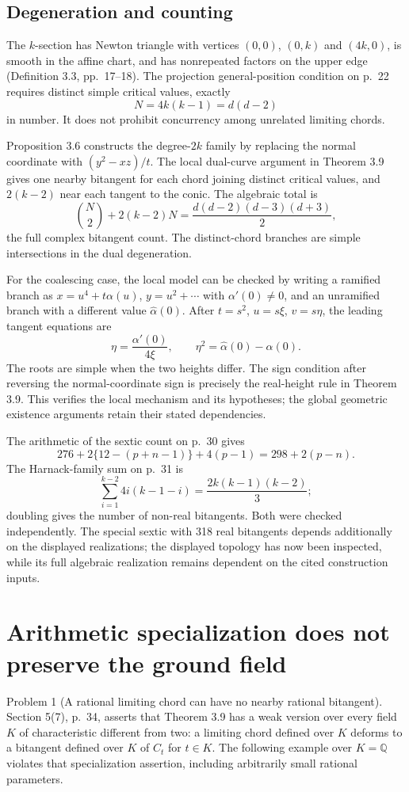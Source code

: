 \documentclass[10pt]{article}
\begin{document}
\subsection*{Degeneration and counting}
The \(k\)-section has Newton triangle with vertices \((0,0)\), \((0,k)\) and \((4k,0)\), is smooth in the affine chart, and has nonrepeated factors on the upper edge (Definition 3.3, pp. 17–18). The projection general-position condition on p. 22 requires distinct simple critical values, exactly \[N=4k(k-1)=d(d-2)\] in number. It does not prohibit concurrency among unrelated limiting chords.\par
Proposition 3.6 constructs the degree-\(2k\) family by replacing the normal coordinate with \((y^2-xz)/t\). The local dual-curve argument in Theorem 3.9 gives one nearby bitangent for each chord joining distinct critical values, and \(2(k-2)\) near each tangent to the conic. The algebraic total is \[\binom{N}{2}+2(k-2)N
 =\frac{d(d-2)(d-3)(d+3)}2,\] the full complex bitangent count. The distinct-chord branches are simple intersections in the dual degeneration.\par
For the coalescing case, the local model can be checked by writing a ramified branch as \(x=u^4+t\alpha(u)\), \(y=u^2+\cdots\) with \(\alpha'(0)\ne0\), and an unramified branch with a different value \(\widehat\alpha(0)\). After \(t=s^2\), \(u=s\xi\), \(v=s\eta\), the leading tangent equations are \[\eta=\frac{\alpha'(0)}{4\xi},\qquad
 \eta^2=\widehat\alpha(0)-\alpha(0).\] The roots are simple when the two heights differ. The sign condition after reversing the normal-coordinate sign is precisely the real-height rule in Theorem 3.9. This verifies the local mechanism and its hypotheses; the global geometric existence arguments retain their stated dependencies.\par
The arithmetic of the sextic count on p. 30 gives \[276+2\{12-(p+n-1)\}+4(p-1)=298+2(p-n).\] The Harnack-family sum on p. 31 is \[\sum_{i=1}^{k-2}4i(k-1-i)=\frac{2k(k-1)(k-2)}3;\] doubling gives the number of non-real bitangents. Both were checked independently. The special sextic with 318 real bitangents depends additionally on the displayed realizations; the displayed topology has now been inspected, while its full algebraic realization remains dependent on the cited construction inputs.\par
\section*{Arithmetic specialization does not preserve the ground field}
Problem 1 (A rational limiting chord can have no nearby rational bitangent).  Section 5(7), p. 34, asserts that Theorem 3.9 has a weak version over every field \(K\) of characteristic different from two: a limiting chord defined over \(K\) deforms to a bitangent defined over \(K\) of \(C_t\) for \(t\in K\). The following example over \(K=\mathbb Q\) violates that specialization assertion, including arbitrarily small rational parameters.\par
\end{document}
